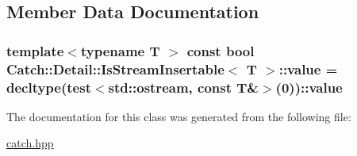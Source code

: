 \subsection{Member Data Documentation}
\hypertarget{class_catch_1_1_detail_1_1_is_stream_insertable_a42818b09ae5851126a70ee263769e309}{
\subsubsection[{value}]{\setlength{\rightskip}{0pt plus 5cm}template$<$typename T $>$ const bool {\bf Catch\-::\-Detail\-::\-Is\-Stream\-Insertable}$<$ T $>$\-::value = decltype({\bf test}$<$std\-::ostream, const T\&$>$(0))\-::value\hspace{0.3cm}{\ttfamily [static]}}}\label{class_catch_1_1_detail_1_1_is_stream_insertable_a42818b09ae5851126a70ee263769e309}


The documentation for this class was generated from the following file\-:\begin{DoxyCompactItemize}
\item 
\hyperlink{catch_8hpp}{catch.\-hpp}\end{DoxyCompactItemize}
